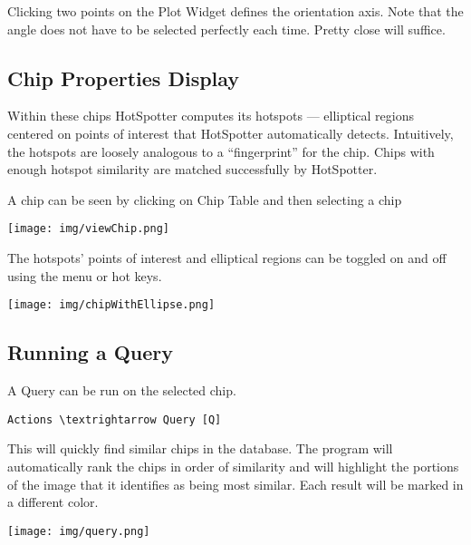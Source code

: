 \documentclass[a4paper,10pt]{article}
\begin{document}
        \noindent
        Clicking two points on the Plot Widget defines the orientation axis.
        Note that the angle does not have to be selected perfectly each time. Pretty close will suffice.

    \subsection{Chip Properties Display} 
        Within these chips HotSpotter computes its hotspots --- elliptical
        regions centered on points of interest that HotSpotter automatically
        detects.  Intuitively, the hotspots are loosely analogous to a
        ``fingerprint'' for the chip.  Chips with enough hotspot similarity
        are matched successfully by HotSpotter.

        A chip can be seen by clicking on Chip Table and then selecting a
        chip 

        \begin{center}
          \texttt{[image: img/viewChip.png]}
        \end{center}

        The hotspots' points of interest and elliptical regions can be
        toggled on and off using the menu or hot keys.
        \begin{center}
            \texttt{[image: img/chipWithEllipse.png]}
        \end{center}

    \subsection{Running a Query}
        A Query can be run on the selected chip.

        \begin{Verbatim}[commandchars=\\\{\}]
        Actions \textrightarrow Query [Q]
        \end{Verbatim}
        
\noindent
        This will quickly find similar chips in the database.  The program will
        automatically rank the chips in order of similarity and will highlight
        the portions of the image that it identifies as being most similar.
        Each result will be marked in a different color.

        \begin{center}
            \texttt{[image: img/query.png]}
        \end{center}
\end{document}
